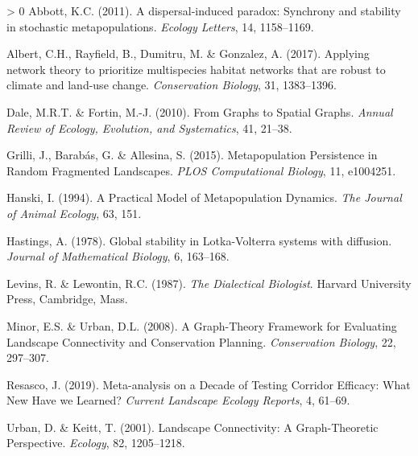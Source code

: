 \documentclass[11pt]{article}
\newlength{\cslhangindent}
\newenvironment{CSLReferences}[3] %
 {%
  \setlength{\parindent}{0pt}
  \ifodd #1 \everypar{\setlength{\hangindent}{\cslhangindent}}\ignorespaces\fi
  \ifnum #2 > 0
  \setlength{\parskip}{#2\baselineskip}
  \fi
 }%
 {}
\begin{document}
\hypertarget{refs}{}
\begin{CSLReferences}{1}{0}
\leavevmode\hypertarget{ref-Abbott2011DisPar}{}%
Abbott, K.C. (2011). A dispersal-induced paradox: Synchrony and
stability in stochastic metapopulations. \emph{Ecology Letters}, 14,
1158--1169.

\leavevmode\hypertarget{ref-Albert2017AppNet}{}%
Albert, C.H., Rayfield, B., Dumitru, M. \& Gonzalez, A. (2017). Applying
network theory to prioritize multispecies habitat networks that are
robust to climate and land-use change. \emph{Conservation Biology}, 31,
1383--1396.

\leavevmode\hypertarget{ref-Dale2010GraSpa}{}%
Dale, M.R.T. \& Fortin, M.-J. (2010). From Graphs to Spatial Graphs.
\emph{Annual Review of Ecology, Evolution, and Systematics}, 41, 21--38.

\leavevmode\hypertarget{ref-Grilli2015MetPer}{}%
Grilli, J., Barabás, G. \& Allesina, S. (2015). Metapopulation
Persistence in Random Fragmented Landscapes. \emph{PLOS Computational
Biology}, 11, e1004251.

\leavevmode\hypertarget{ref-Hanski1994PraMod}{}%
Hanski, I. (1994). A Practical Model of Metapopulation Dynamics.
\emph{The Journal of Animal Ecology}, 63, 151.

\leavevmode\hypertarget{ref-Hastings1978GloSta}{}%
Hastings, A. (1978). Global stability in Lotka-Volterra systems with
diffusion. \emph{Journal of Mathematical Biology}, 6, 163--168.

\leavevmode\hypertarget{ref-Levins1987DiaBio}{}%
Levins, R. \& Lewontin, R.C. (1987). \emph{The Dialectical Biologist}.
Harvard University Press, Cambridge, Mass.

\leavevmode\hypertarget{ref-Minor2008GraFra}{}%
Minor, E.S. \& Urban, D.L. (2008). A Graph-Theory Framework for
Evaluating Landscape Connectivity and Conservation Planning.
\emph{Conservation Biology}, 22, 297--307.

\leavevmode\hypertarget{ref-Resasco2019MetDec}{}%
Resasco, J. (2019). Meta-analysis on a Decade of Testing Corridor
Efficacy: What New Have we Learned? \emph{Current Landscape Ecology
Reports}, 4, 61--69.

\leavevmode\hypertarget{ref-Urban2001LanCon}{}%
Urban, D. \& Keitt, T. (2001). Landscape Connectivity: A Graph-Theoretic
Perspective. \emph{Ecology}, 82, 1205--1218.

\end{CSLReferences}
\end{document}
